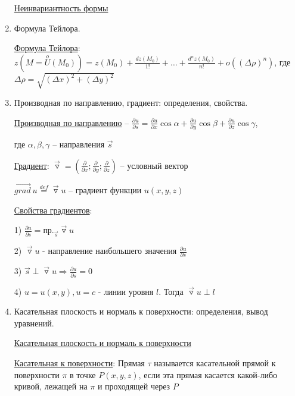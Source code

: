 \documentclass[12pt]{article}
\begin{document}
\begin{enumerate}
        \hyperlink{noninvariantofseconddifferentialoffunctionoftwovariables}{Неинвариантность формы}

        \item Формула Тейлора.

        \hyperlink{formulataylor}{Формула Тейлора}: $\displaystyle z(M = \stackrel{o}{U}(M_0)) = z(M_0) + \frac{dz(M_0)}{1!} + \dots + \frac{d^n z(M_0)}{n!} + o((\Delta \rho)^n)$,
        где $\Delta \rho = \sqrt{(\Delta x)^2 + (\Delta y)^2}$

        \item Производная по направлению, градиент: определения, свойства.

        \hyperlink{derivativeoffunctionindirection}{Производная по направлению} -- $\frac{\partial u}{\partial s} = \frac{\partial u}{\partial x} \cos\alpha + \frac{\partial u}{\partial y} \cos\beta + \frac{\partial u}{\partial z} \cos\gamma$,

        где $\alpha, \beta, \gamma$ -- направления $\overrightarrow{s}$

        \hyperlink{gradientdefinition}{Градиент}: $\overrightarrow{\triangledown} = \left(\frac{\partial}{\partial x}; \frac{\partial}{\partial y}; \frac{\partial}{\partial z}\right)$ -- условный вектор

        $\overrightarrow{grad} \ u \stackrel{def}{=} \overrightarrow{\triangledown} u$ -- градиент функции $u(x, y, z)$

        \hyperlink{gradientproperties}{Свойства градиентов}:

        1) $\frac{\partial u}{\partial s} = \text{пр.}_{\overrightarrow{s}} \overrightarrow{\triangledown} u$

        2) $\overrightarrow{\triangledown} u$ - направление наибольшего значения $\frac{\partial u}{\partial s}$

        3) $\overrightarrow{s} \perp \overrightarrow{\triangledown} u \Longrightarrow \frac{\partial u}{\partial s} = 0$

        4) $u = u(x, y), u = c$ - линии уровня $l$. Тогда $\overrightarrow{\triangledown} u \perp l$


        \item Касательная плоскость и нормаль к поверхности: определения, вывод уравнений.

        \hyperlink{tangentandnormaltosurface}{Касательная плоскость и нормаль к поверхности}

        \hyperlink{tangenttosurface}{Касательная к поверхности}: Прямая $\tau$ называется касательной прямой к поверхности $\pi$ в точке $P(x, y, z)$,
        если эта прямая касается какой-либо кривой, лежащей на $\pi$ и проходящей через $P$


\end{enumerate}
\end{document}
